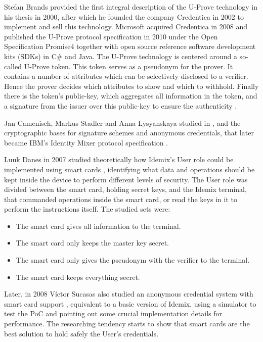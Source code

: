 \documentclass[journal]{IEEEtran}
\begin{document}
Stefan Brands provided the first integral description of the U-Prove
technology in his thesis \cite{uprove} in 2000, after which he founded the company Credentica
in 2002 to implement and sell this technology. Microsoft acquired Credentica
in 2008 and published the U-Prove protocol specification \cite{uprove2} in 2010
under the Open Specification Promise4 together with open source reference software
development kits (SDKs) in C\# and Java.
The U-Prove technology is centered around a so-called U-Prove token. This
token serves as a pseudonym for the prover. It contains a number of attributes
which can be selectively disclosed to a verifier. Hence the prover decides which
attributes to show and which to withhold. Finally there is the token’s public-key, which aggregates all information in the token, and a signature from the issuer
over this public-key to ensure the authenticity \cite{book:947508}.



\hfil

Jan Camenisch, Markus Stadler and Anna Lysyanskaya studied in \cite{Camenisch:GroupSig}, \cite{Camenisch:AnonCred} and \cite{camenisch2002signature} the cryptographic bases for signature schemes and anonymous credentials, that later became IBM's Identity Mixer protocol specification \cite{idemixSpec}.


Luuk Danes in 2007 studied theoretically how Idemix's User role could be implemented using  
smart cards \cite{luuk}, identifying what data and operations should be kept inside the device to perform different levels of security. The User role was divided between the smart card, holding secret keys, and the Idemix terminal, that commanded operations inside the smart card, or read the keys in it to perform the instructions itself. The studied sets were:
\begin{itemize}
	\item The smart card gives all information to the terminal.
	\item The smart card only keeps the master key secret.
	\item The smart card only gives the pseudonym with the verifier to the terminal.
	\item The smart card keeps everything secret.
\end{itemize}

Later, in 2008 Víctor Sucasas also studied an anonymous credential system with smart card support \cite{sucasas}, equivalent to a basic version of Idemix, using a simulator to test the PoC and pointing out some crucial implementation details for performance. The researching tendency starts to show that smart cards are the best solution to hold safely the User's credentials.
\end{document}
